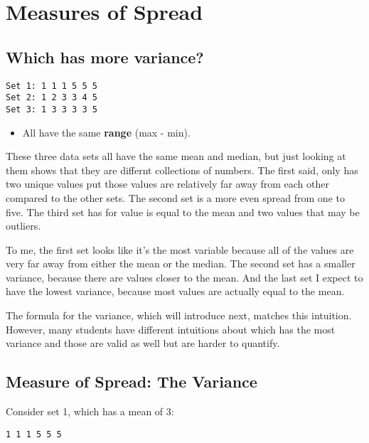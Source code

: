 \documentclass[
  letterpaper,
  DIV=11,
  numbers=noendperiod]{scrreprt}
\providecommand{\tightlist}{%
  \setlength{\itemsep}{0pt}\setlength{\parskip}{0pt}}\usepackage{longtable,booktabs,array}
\begin{document}
\hypertarget{measures-of-spread}{%
\section{Measures of Spread}\label{measures-of-spread}}

\hypertarget{which-has-more-variance}{%
\subsection{Which has more variance?}\label{which-has-more-variance}}

\begin{verbatim}
Set 1: 1 1 1 5 5 5
Set 2: 1 2 3 3 4 5
Set 3: 1 3 3 3 3 5
\end{verbatim}

\begin{itemize}
\tightlist
\item
  All have the same \textbf{range} (max - min).
\end{itemize}

These three data sets all have the same mean and median, but just
looking at them shows that they are differnt collections of numbers. The
first said, only has two unique values put those values are relatively
far away from each other compared to the other sets. The second set is a
more even spread from one to five. The third set has for value is equal
to the mean and two values that may be outliers.

To me, the first set looks like it's the most variable because all of
the values are very far away from either the mean or the median. The
second set has a smaller variance, because there are values closer to
the mean. And the last set I expect to have the lowest variance, because
most values are actually equal to the mean.

The formula for the variance, which will introduce next, matches this
intuition. However, many students have different intuitions about which
has the most variance and those are valid as well but are harder to
quantify.

\hypertarget{measure-of-spread-the-variance}{%
\subsection{Measure of Spread: The
Variance}\label{measure-of-spread-the-variance}}

Consider set 1, which has a mean of 3:

\begin{verbatim}
1 1 1 5 5 5
\end{verbatim}
\end{document}
